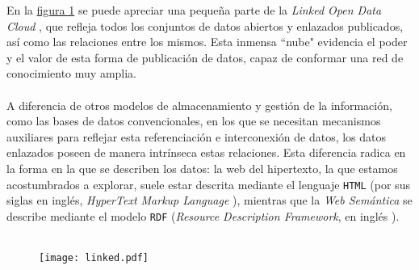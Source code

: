         \noindent En la \hyperref[fig:lod]{figura 1} se puede apreciar una pequeña parte de la \textit{Linked Open Data Cloud} \cite{LOD}, que refleja todos los conjuntos de datos abiertos y enlazados publicados, así como las relaciones entre los mismos. Esta inmensa ``nube" evidencia el poder y el valor de esta forma de publicación de datos, capaz de conformar una red de conocimiento muy amplia.
        \\ \\
        A diferencia de otros modelos de almacenamiento y gestión de la información, como las bases de datos convencionales, en los que se necesitan mecanismos auxiliares para reflejar esta referenciación e interconexión de datos, los datos enlazados poseen de manera intrínseca estas relaciones. Esta diferencia radica en la forma en la que se describen los datos: la web del hipertexto, la que estamos acostumbrados a explorar, suele estar descrita mediante el lenguaje \texttt{HTML} (por sus siglas en inglés, \textit{HyperText Markup Language} \cite{HTML}), mientras que la \textit{Web Semántica} se describe mediante el modelo \texttt{RDF} (\textit{Resource Description Framework}, en inglés \cite{RDF}).
        \\ \\
        
        \begin{figure}[h]
            \centering
            \texttt{[image: linked.pdf]}
            \label{fig:linked}
        \end{figure}

